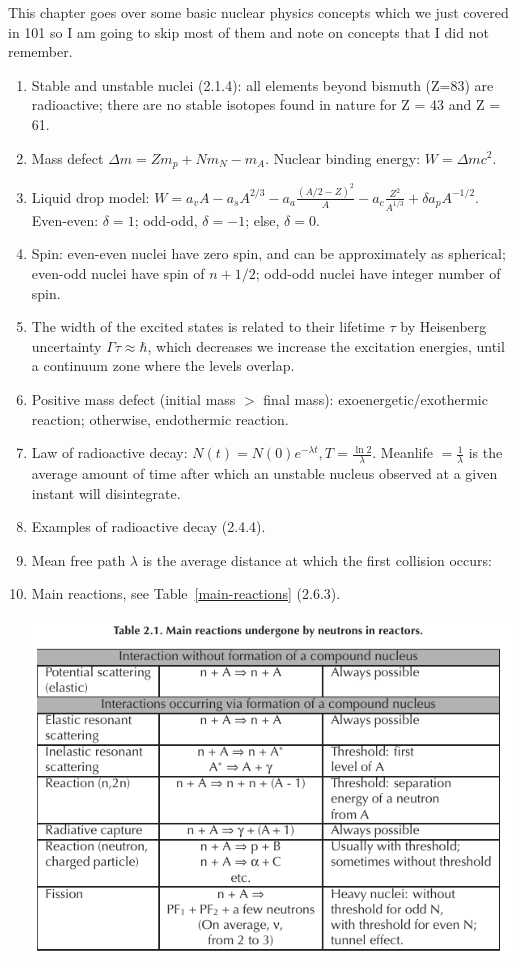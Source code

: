 \documentclass{school-22.211-notes}
\begin{document}
\clearpage
This chapter goes over some basic nuclear physics concepts which we just covered in 101 so I am going to skip most of them and note on concepts that I did not remember.
\begin{enumerate}
\item Stable and unstable nuclei (2.1.4): all elements beyond bismuth (Z=83) are radioactive; there are no stable isotopes found in nature for Z = 43 and Z = 61. 
\item Mass defect $\Delta m = Z m_p + N m_N - m_A$. Nuclear binding energy: $W = \Delta m c^2$. 
\item Liquid drop model: $W = a_v A - a_s A^{2/3} - a_a \frac{(A/2 - Z)^2}{A} - a_c \frac{Z^2}{A^{1/3}} + \delta a_p A^{-1/2}.$ Even-even: $\delta = 1$; odd-odd, $\delta = -1$; else, $\delta = 0$. 
\item Spin: even-even nuclei have zero spin, and can be approximately as spherical; even-odd nuclei have spin of $n+1/2$; odd-odd nuclei have integer number of spin. 
\item The width of the excited states is related to their lifetime $\tau$ by Heisenberg uncertainty $\Gamma \tau \approx \hbar$, which decreases we increase the excitation energies, until a continuum zone where the levels overlap. 
\item Positive mass defect (initial mass $>$ final mass): exoenergetic/exothermic reaction; otherwise, endothermic reaction. 
\item Law of radioactive decay: $N(t) = N(0) e^{-\lambda t}, T = \frac{\ln 2}{\lambda}$. Meanlife $=\frac{1}{\lambda}$ is the average amount of time after which an unstable nucleus observed at a given instant will disintegrate.  
\item Examples of radioactive decay (2.4.4).
\item Mean free path $\lambda$ is the average distance at which the first collision occurs:
\item Main reactions, see Table~\ref{main-reactions} (2.6.3).
  \begin{table}
    \centering
    \includegraphics[width=5in]{images/intro/main-reactions.png}

\end{table}
\end{enumerate}
\end{document}
